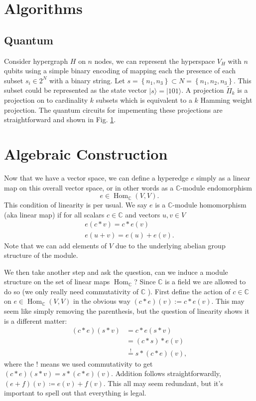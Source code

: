 \documentclass{article}
\newcommand{\ket}[1]{|#1\rangle}
\newcommand{\set}[1]{\left\{ #1 \right\}}
\newcommand{\field}{\mathbb{C}}
\DeclareMathOperator{\Hom}{Hom}
\newcommand{\fullProj}{\widetilde{\Pi}}
\begin{document}
\section{Algorithms} \label{sec:algorithms}
\subsection{Quantum}
Consider hypergraph $H$ on $n$ nodes, we can represent the hyperspace $V_H$ with $n$ qubits using a simple binary encoding of mapping each the presence of each subset $s_i \in 2^N$ with a binary string. Let $s = \set{n_1, n_3} \subset N = \set{n_1, n_2, n_3} $. This subset could be represented as the state vector $\ket{s} = \ket{101}$. A projection $\fullProj_k$ is a projection on to cardinality $k$ subsets which is equivalent to a $k$ Hamming weight projection. The quantum circuits for impementing these projections are straightforward and shown in Fig. \ref{fig:projection_circuits}.



\begin{figure} \label{fig:projection_circuits}
    
\end{figure}

\section{Algebraic Construction}
Now that we have a vector space, we can define a hyperedge $e$ simply as a linear map on this overall vector space, or in other words as a $\field$-module endomorphism
\begin{equation}
    e \in \Hom_{\field} (V, V).
\end{equation}
This condition of linearity is per usual. We say $e$ is a $\field$-module homomorphism (aka linear map) if for all scalars $c \in \field$ and vectors $u, v \in V$
\begin{align}
    e(c * v) = c * e(v) \\
    e (u + v) = e(u) + e(v).
\end{align}
Note that we can add elements of $V$ due to the underlying abelian group structure of the module. 

We then take another step and ask the question, can we induce a module structure on the set of linear maps $\Hom_{\field}$? Since $\field$ is a field we are allowed to do so (we only really need commutativity of $\field$ ). First define the action of $c \in \field$ on $e \in \Hom_\field(V, V)$ in the obvious way $(c * e) (v) := c * e(v)$. This may seem like simply removing the parenthesis, but the question of linearity shows it is a different matter:
\begin{align}
    (c * e) (s * v) &= c * e( s * v) \\
    &= (c * s) * e(v) \\
    &\overset{!}{=} s * (c * e) (v),
\end{align}
where the ! means we used commutativity to get $(c *e) (s * v) = s * (c * e) (v)$. Addition follows straightforwardly, $(e+f) (v) \coloneqq e(v) + f(v)$. This all may seem redundant, but it's important to spell out that everything is legal.
\end{document}

